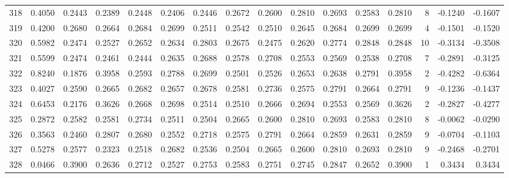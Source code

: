 \begin{tabular}{lrrrrrrrrrrrrrrr}
318 &      0.4050 &  0.2443 &  0.2389 &  0.2448 &  0.2406 &  0.2446 &  0.2672 &  0.2600 &  0.2810 &  0.2693 &   0.2583 &     0.2810 &      8 &                   -0.1240 &                    -0.1607 \\
319 &      0.4200 &  0.2680 &  0.2664 &  0.2684 &  0.2699 &  0.2511 &  0.2542 &  0.2510 &  0.2645 &  0.2684 &   0.2699 &     0.2699 &      4 &                   -0.1501 &                    -0.1520 \\
320 &      0.5982 &  0.2474 &  0.2527 &  0.2652 &  0.2634 &  0.2803 &  0.2675 &  0.2475 &  0.2620 &  0.2774 &   0.2848 &     0.2848 &     10 &                   -0.3134 &                    -0.3508 \\
321 &      0.5599 &  0.2474 &  0.2461 &  0.2444 &  0.2635 &  0.2688 &  0.2578 &  0.2708 &  0.2553 &  0.2569 &   0.2538 &     0.2708 &      7 &                   -0.2891 &                    -0.3125 \\
322 &      0.8240 &  0.1876 &  0.3958 &  0.2593 &  0.2788 &  0.2699 &  0.2501 &  0.2526 &  0.2653 &  0.2638 &   0.2791 &     0.3958 &      2 &                   -0.4282 &                    -0.6364 \\
323 &      0.4027 &  0.2590 &  0.2665 &  0.2682 &  0.2657 &  0.2678 &  0.2581 &  0.2736 &  0.2575 &  0.2791 &   0.2664 &     0.2791 &      9 &                   -0.1236 &                    -0.1437 \\
324 &      0.6453 &  0.2176 &  0.3626 &  0.2668 &  0.2698 &  0.2514 &  0.2510 &  0.2666 &  0.2694 &  0.2553 &   0.2569 &     0.3626 &      2 &                   -0.2827 &                    -0.4277 \\
325 &      0.2872 &  0.2582 &  0.2581 &  0.2734 &  0.2511 &  0.2504 &  0.2665 &  0.2600 &  0.2810 &  0.2693 &   0.2583 &     0.2810 &      8 &                   -0.0062 &                    -0.0290 \\
326 &      0.3563 &  0.2460 &  0.2807 &  0.2680 &  0.2552 &  0.2718 &  0.2575 &  0.2791 &  0.2664 &  0.2859 &   0.2631 &     0.2859 &      9 &                   -0.0704 &                    -0.1103 \\
327 &      0.5278 &  0.2577 &  0.2323 &  0.2518 &  0.2682 &  0.2536 &  0.2504 &  0.2665 &  0.2600 &  0.2810 &   0.2693 &     0.2810 &      9 &                   -0.2468 &                    -0.2701 \\
328 &      0.0466 &  0.3900 &  0.2636 &  0.2712 &  0.2527 &  0.2753 &  0.2583 &  0.2751 &  0.2745 &  0.2847 &   0.2652 &     0.3900 &      1 &                    0.3434 &                     0.3434 \\

\end{tabular}
